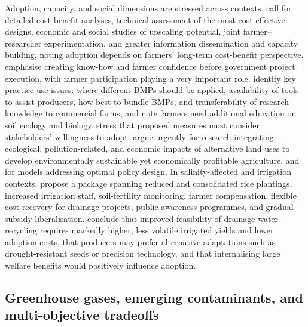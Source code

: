 Adoption, capacity, and social dimensions are stressed across contexts. \textcite{Okwany2016} call for detailed cost-benefit analyses, technical assessment of the most cost-effective designs, economic and social studies of upscaling potential, joint farmer--researcher experimentation, and greater information dissemination and capacity building, noting adoption depends on farmers' long-term cost-benefit perspective. \textcite{Ghumman2011} emphasise creating know-how and farmer confidence before government project execution, with farmer participation playing a very important role. \textcite{Ward2018} identify key practice-use issues: where different BMPs should be applied, availability of tools to assist producers, how best to bundle BMPs, and transferability of research knowledge to commercial farms, and note farmers need additional education on soil ecology and biology. \textcite{Cuevas2019} stress that proposed measures must consider stakeholders' willingness to adopt. \textcite{Saikkonen2014} argue urgently for research integrating ecological, pollution-related, and economic impacts of alternative land uses to develop environmentally sustainable yet economically profitable agriculture, and for models addressing optimal policy design. In salinity-affected and irrigation contexts, \textcite{Kotb2000} propose a package spanning reduced and consolidated rice plantings, increased irrigation staff, soil-fertility monitoring, farmer compensation, flexible cost-recovery for drainage projects, public-awareness programmes, and gradual subsidy liberalisation. \textcite{Sellars2022} conclude that improved feasibility of drainage-water-recycling requires markedly higher, less volatile irrigated yields and lower adoption costs, that producers may prefer alternative adaptations such as drought-resistant seeds or precision technology, and that internalising large welfare benefits would positively influence adoption.

\subsection{Greenhouse gases, emerging contaminants, and multi-objective tradeoffs}

